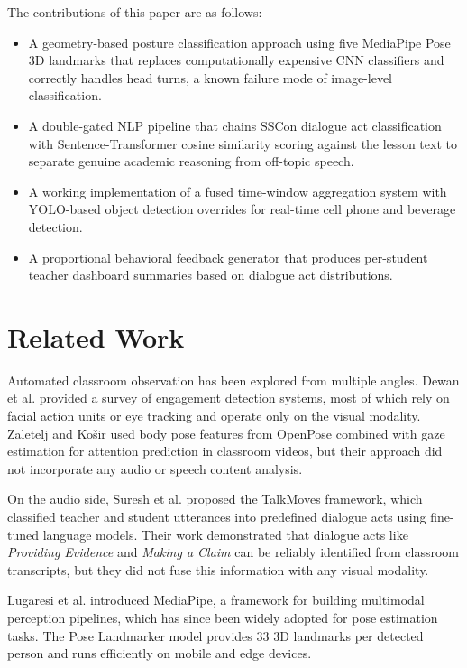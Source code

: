 \documentclass[conference]{IEEEtran}
\begin{document}
The contributions of this paper are as follows:
\begin{itemize}
    \item A geometry-based posture classification approach using five MediaPipe Pose 3D landmarks that replaces computationally expensive CNN classifiers and correctly handles head turns, a known failure mode of image-level classification.
    \item A double-gated NLP pipeline that chains SSCon dialogue act classification with Sentence-Transformer cosine similarity scoring against the lesson text to separate genuine academic reasoning from off-topic speech.
    \item A working implementation of a fused time-window aggregation system with YOLO-based object detection overrides for real-time cell phone and beverage detection.
    \item A proportional behavioral feedback generator that produces per-student teacher dashboard summaries based on dialogue act distributions.
\end{itemize}

\section{Related Work}

Automated classroom observation has been explored from multiple angles. Dewan et al. \cite{b7} provided a survey of engagement detection systems, most of which rely on facial action units or eye tracking and operate only on the visual modality. Zaletelj and Ko\v{s}ir \cite{b8} used body pose features from OpenPose combined with gaze estimation for attention prediction in classroom videos, but their approach did not incorporate any audio or speech content analysis.

On the audio side, Suresh et al. \cite{b4} proposed the TalkMoves framework, which classified teacher and student utterances into predefined dialogue acts using fine-tuned language models. Their work demonstrated that dialogue acts like \emph{Providing Evidence} and \emph{Making a Claim} can be reliably identified from classroom transcripts, but they did not fuse this information with any visual modality.

Lugaresi et al. \cite{b2} introduced MediaPipe, a framework for building multimodal perception pipelines, which has since been widely adopted for pose estimation tasks. The Pose Landmarker model provides 33 3D landmarks per detected person and runs efficiently on mobile and edge devices.
\end{document}
